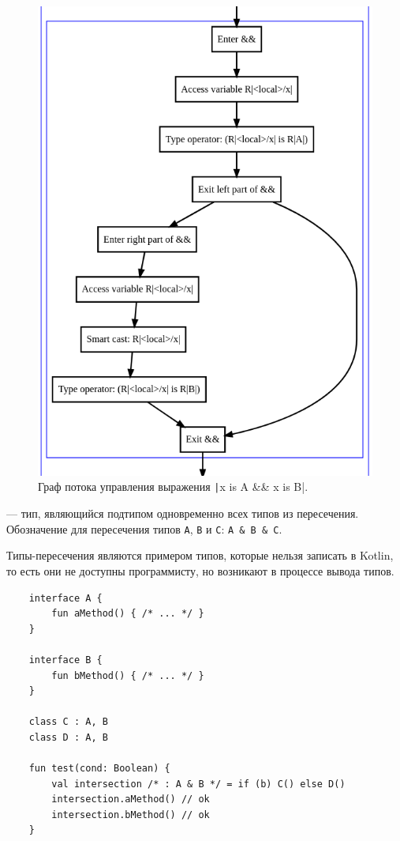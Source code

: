 \begin{figure}
    \centering
    \includegraphics[width=0.8\linewidth]{fig/cfgExample}
    \caption{Граф потока управления выражения \texttt|x is A && x is B|.}
    \label{fig:cfg-example}
\end{figure}

\begin{definition}
    \label{def:intersection-types}
     --- тип, являющийся подтипом одновременно всех типов из пересечения.
    Обозначение для пересечения типов \texttt{A}, \texttt{B} и \texttt{C}: \texttt{A \& B \& C}.
\end{definition}

Типы-пересечения являются примером типов, которые нельзя записать в Kotlin, то есть они не доступны программисту, но возникают в процессе вывода типов.
\begin{verbatim}
    interface A {
        fun aMethod() { /* ... */ }
    }

    interface B {
        fun bMethod() { /* ... */ }
    }

    class C : A, B
    class D : A, B

    fun test(cond: Boolean) {
        val intersection /* : A & B */ = if (b) C() else D()
        intersection.aMethod() // ok
        intersection.bMethod() // ok
    }
\end{verbatim}

